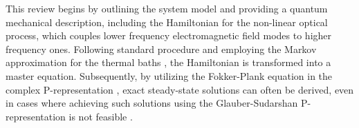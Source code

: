 \documentclass[fleqn,11pt]{wlscirep}
\begin{document}
This review begins by outlining the system model and providing a quantum mechanical description, including the Hamiltonian for the non-linear optical process, which couples lower frequency electromagnetic field modes to higher frequency ones. Following standard procedure and employing the Markov approximation for the thermal baths \cite{louisell1973,walls2008}, the Hamiltonian is transformed into a master equation. Subsequently, by utilizing the Fokker-Plank equation in the complex P-representation \cite{drummond1980}, exact steady-state solutions can often be derived, even in cases where achieving such solutions using the Glauber-Sudarshan P-representation is not feasible \cite{glauber1963,sudarshan1963}.













\end{document}
